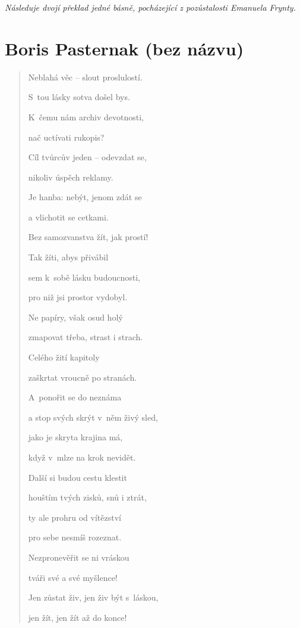 \bigskip 

\noindent
\textit{Následuje dvojí překlad jedné básně, pocházející z pozůstalosti Emanuela Frynty.}


\section{Boris Pasternak (bez názvu)}

\begin{verse}


Neblahá věc -- slout proslulostí.

S~tou lásky sotva došel bys.

K~čemu nám archiv devotnosti,

nač uctívati rukopis?

\medskip

Cíl tvůrcův jeden -- odevzdat se,

nikoliv úspěch reklamy.

Je hanba: nebýt, jenom zdát se

a vlichotit se cetkami.

\medskip

Bez samozvanstva žít, jak prostí!

Tak žíti, abys přivábil

sem k~sobě lásku budoucnosti,

pro niž jsi prostor vydobyl.

\medskip

Ne papíry, však osud holý

zmapovat třeba, strast i strach.

Celého žití kapitoly

zaškrtat vroucně po stranách.

\medskip

A~ponořit se do neznáma

a stop svých skrýt v~něm živý sled,

jako je skryta krajina má,

když v~mlze na krok nevidět.

\medskip

Další si budou cestu klestit

houštím tvých zisků, snů i ztrát,

ty ale prohru od vítězství

pro sebe nesmíš rozeznat.

\medskip

Nezpronevěřit se ni vráskou

tváři své a své myšlence!

Jen zůstat živ, jen živ být s~láskou,

jen žít, jen žít až do konce!

\end{verse}


